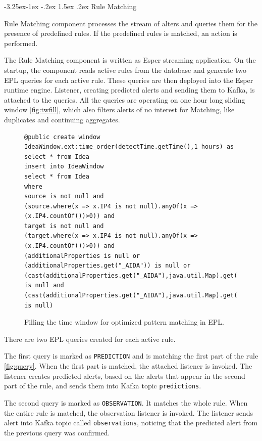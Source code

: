 \documentclass[a4paper]{article} %
\makeatletter
\renewcommand\subsection{\@startsection{subsection}{2}{\z@}%
                   {-3.25ex\@plus -1ex \@minus -.2ex}%
                   {1.5ex \@plus .2ex}%
                   {\normalfont\sffamily\large\bfseries\color{projectcolor}}}
\makeatother
\begin{document}
\subsection{Rule Matching}

Rule Matching component processes the stream of alters and queries them for the presence of predefined rules. If the predefined rules is matched, an action is performed.

The Rule Matching component is written as Esper streaming application. On the startup, the component reads active rules from the database and generate two EPL queries for each active rule. These queries are then deployed into the Esper runtime engine. Listener, creating predicted alerts and sending them to Kafka, is attached to the queries. All the queries are operating on one hour long sliding window \autoref{fig:twfill}, which also filters alerts of no interest for Matching, like duplicates and continuing aggregates.

\begin{figure}[h!]
\begin{lstlisting}[]
@public create window IdeaWindow.ext:time_order(detectTime.getTime(),1 hours) as select * from Idea
insert into IdeaWindow
select * from Idea
where
source is not null and
(source.where(x => x.IP4 is not null).anyOf(x => (x.IP4.countOf())>0)) and
target is not null and
(target.where(x => x.IP4 is not null).anyOf(x => (x.IP4.countOf())>0)) and
(additionalProperties is null or (additionalProperties.get("_AIDA")) is null or
(cast(additionalProperties.get("_AIDA"),java.util.Map).get("Duplicate")) is null and
(cast(additionalProperties.get("_AIDA"),java.util.Map).get("Continuing")) is null)
\end{lstlisting}
\caption{Filling the time window for optimized pattern matching in EPL.}
\label{fig:twfill}
\end{figure}

There are two EPL queries created for each active rule.

The first query is marked as \texttt{PREDICTION} and is matching the first part of the rule \autoref{fig:query}. When the first part is matched, the attached listener is invoked. The listener creates predicted alerts, based on the alerts that appear in the second part of the rule, and sends them into Kafka topic \texttt{predictions}.

The second query is marked as \texttt{OBSERVATION}. It matches the whole rule. When the entire rule is matched, the observation listener is invoked. The listener sends alert into Kafka topic called \texttt{observations}, noticing that the predicted alert from the previous query was confirmed.
\end{document}
